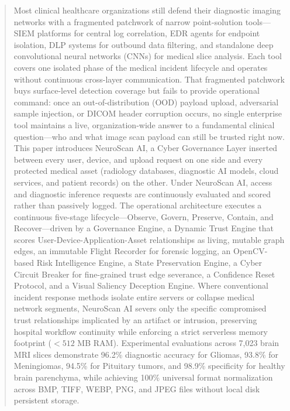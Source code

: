 \documentclass[conference]{IEEEtran}
\begin{document}
\begin{abstract}
Most clinical healthcare organizations still defend their diagnostic imaging networks with a fragmented patchwork of narrow point-solution tools—SIEM platforms for central log correlation, EDR agents for endpoint isolation, DLP systems for outbound data filtering, and standalone deep convolutional neural networks (CNNs) for medical slice analysis. Each tool covers one isolated phase of the medical incident lifecycle and operates without continuous cross-layer communication. That fragmented patchwork buys surface-level detection coverage but fails to provide operational command: once an out-of-distribution (OOD) payload upload, adversarial sample injection, or DICOM header corruption occurs, no single enterprise tool maintains a live, organization-wide answer to a fundamental clinical question—who and what image scan payload can still be trusted right now. This paper introduces NeuroScan AI, a Cyber Governance Layer inserted between every user, device, and upload request on one side and every protected medical asset (radiology databases, diagnostic AI models, cloud services, and patient records) on the other. Under NeuroScan AI, access and diagnostic inference requests are continuously evaluated and scored rather than passively logged. The operational architecture executes a continuous five-stage lifecycle—Observe, Govern, Preserve, Contain, and Recover—driven by a Governance Engine, a Dynamic Trust Engine that scores User-Device-Application-Asset relationships as living, mutable graph edges, an immutable Flight Recorder for forensic logging, an OpenCV-based Risk Intelligence Engine, a State Preservation Engine, a Cyber Circuit Breaker for fine-grained trust edge severance, a Confidence Reset Protocol, and a Visual Saliency Deception Engine. Where conventional incident response methods isolate entire servers or collapse medical network segments, NeuroScan AI severs only the specific compromised trust relationships implicated by an artifact or intrusion, preserving hospital workflow continuity while enforcing a strict serverless memory footprint ($< 512$ MB RAM). Experimental evaluations across 7,023 brain MRI slices demonstrate 96.2\% diagnostic accuracy for Gliomas, 93.8\% for Meningiomas, 94.5\% for Pituitary tumors, and 98.9\% specificity for healthy brain parenchyma, while achieving 100\% universal format normalization across BMP, TIFF, WEBP, PNG, and JPEG files without local disk persistent storage.
\end{abstract}
\end{document}
